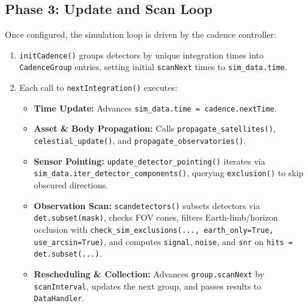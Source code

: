 \documentclass[11pt,a4paper]{article}
\begin{document}
\subsection{Phase 3: Update and Scan Loop}
Once configured, the simulation loop is driven by the cadence controller:
\begin{enumerate}
    \item \texttt{initCadence()} groups detectors by unique integration times into
    \texttt{CadenceGroup} entries, setting initial \texttt{scanNext} times to
    \texttt{sim\_data.time}.
    \item Each call to \texttt{nextIntegration()} executes:
    \begin{itemize}
        \item \textbf{Time Update:} Advances \texttt{sim\_data.time = cadence.nextTime}.
        \item \textbf{Asset \& Body Propagation:} Calls \texttt{propagate\_satellites()},
        \texttt{celestial\_update()}, and \texttt{propagate\_observatories()}.
        \item \textbf{Sensor Pointing:} \texttt{update\_detector\_pointing()} iterates via
        \texttt{sim\_data.iter\_detector\_components()}, querying \texttt{exclusion()} to skip
        obscured directions.
        \item \textbf{Observation Scan:} \texttt{scandetectors()} subsets detectors via
        \texttt{det.subset(mask)}, checks FOV cones, filters Earth-limb/horizon occlusion with
        \texttt{check\_sim\_exclusions(..., earth\_only=True, use\_arcsin=True)}, and computes
        \texttt{signal}, \texttt{noise}, and \texttt{snr} on \texttt{hits = det.subset(...)}.
        \item \textbf{Rescheduling \& Collection:} Advances \texttt{group.scanNext} by
        \texttt{scanInterval}, updates the next group, and passes results to \texttt{DataHandler}.
    \end{itemize}
\end{enumerate}
\end{document}
